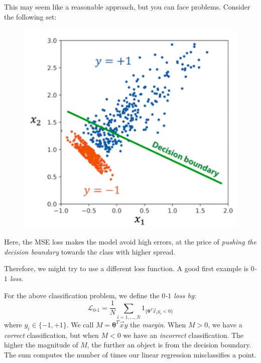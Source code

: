 This may seem like a reasonable approach, but you can face problems. Consider the following set:
\begin{figure}[H]
\centering
\includegraphics[scale=0.4]{decisionboundary.png}
\end{figure}
Here, the MSE loss makes the model avoid high errors, at the price of \textit{pushing the decision boundary} towards the class with higher spread.




\newpage

Therefore, we might try to use a different loss function. A good first example is \textit{$0$-$1$ loss}.
\begin{framedef}
For the above classification problem, we define the \textit{$0$-$1$ loss by}:
\begin{equation*}
\mathcal{L}_{0\text{-}1} = \frac{1}{N} \sum_{i=1,...,N} 1_{\{\pmb{\theta}^T \vec{x}_i y_i < 0\}}
\end{equation*}
where $y_i \in \{-1,+1\}$. We call $M = \pmb{\theta}^T \vec{x} y$ the \textit{margin}. When $M > 0$, we have a \textit{correct} classification, but when $M < 0$ we have an \textit{incorrect} classification. The higher the magnitude of $M$, the further an object is from the decision boundary. \\

The sum computes the number of times our linear regression misclassifies a point. 
\end{framedef}

